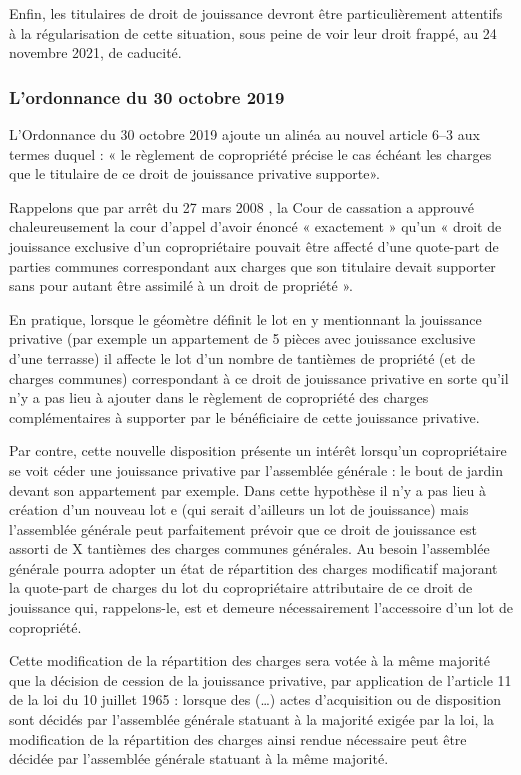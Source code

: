 			Enfin, les titulaires de droit de jouissance devront être particulièrement attentifs à la régularisation de
			cette situation, sous peine de voir leur droit frappé, au 24 novembre 2021, de caducité.
		
		\subsubsection{L’ordonnance du 30 octobre 2019}
		
			L’Ordonnance du 30 octobre 2019 ajoute un alinéa au nouvel article 6–3 aux termes duquel : « le règlement
			de copropriété précise le cas échéant les charges que le titulaire de ce droit de jouissance privative
			supporte».
			
			Rappelons que par arrêt du 27 mars 2008 , la Cour de cassation a approuvé chaleureusement la cour
			d’appel d’avoir énoncé « exactement » qu’un « droit de jouissance exclusive d’un copropriétaire pouvait
			être affecté d’une quote-part de parties communes correspondant aux charges que son titulaire devait
			supporter sans pour autant être assimilé à un droit de propriété ».
			
			En pratique, lorsque le géomètre définit le lot en y mentionnant la jouissance privative (par exemple un
			appartement de 5 pièces avec jouissance exclusive d’une terrasse) il affecte le lot d’un nombre de
			tantièmes de propriété (et de charges communes) correspondant à ce droit de jouissance privative en
			sorte qu’il n’y a pas lieu à ajouter dans le règlement de copropriété des charges complémentaires à
			supporter par le bénéficiaire de cette jouissance privative.
			
			Par contre, cette nouvelle disposition présente un intérêt lorsqu’un copropriétaire se voit céder une
			jouissance privative par l’assemblée générale : le bout de jardin devant son appartement par exemple.
			Dans cette hypothèse il n’y a pas lieu à création d’un nouveau lot e (qui serait d’ailleurs un lot de
			jouissance) mais l’assemblée générale peut parfaitement prévoir que ce droit de jouissance est assorti de
			X tantièmes des charges communes générales. Au besoin l’assemblée générale pourra adopter un état de
			répartition des charges modificatif majorant la quote-part de charges du lot du copropriétaire attributaire
			de ce droit de jouissance qui, rappelons-le, est et demeure nécessairement l’accessoire d’un lot de
			copropriété.
			
			Cette modification de la répartition des charges sera votée à la même majorité que la décision de cession
			de la jouissance privative, par application de l’article 11 de la loi du 10 juillet 1965 : lorsque des (…) actes
			d'acquisition ou de disposition sont décidés par l'assemblée générale statuant à la majorité exigée par la
			loi, la modification de la répartition des charges ainsi rendue nécessaire peut être décidée par l'assemblée
			générale statuant à la même majorité.
			
